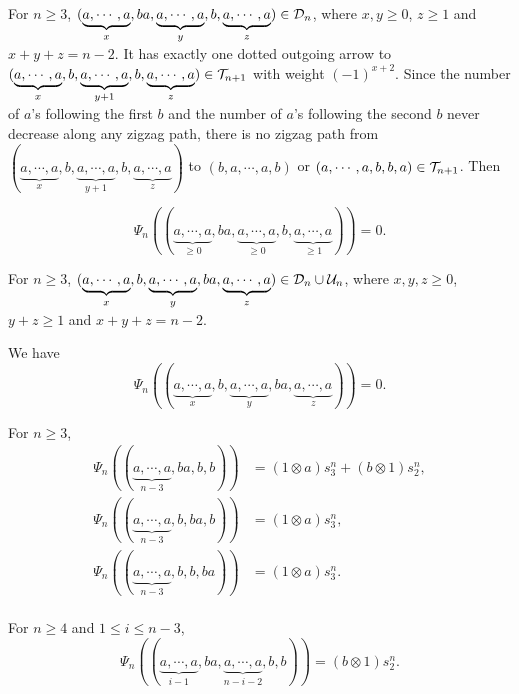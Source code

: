 \documentclass[10pt, reqno]{amsart}
\theoremstyle{definition}
\theoremstyle{remark}
\numberwithin{equation}{section}
\begin{document}
For \(n\ge 3\),  \((\underbrace{a,\cdots,a}_{x},ba,\underbrace{a,\cdots,a}_{y},b,\underbrace{a,\cdots,a}_{z})\in \mathcal{D}_n\), where \(x, y\ge 0\), \(z\ge1\) and \(x+y+z=n-2\). 
It has exactly one dotted outgoing arrow to \((\underbrace{a,\cdots,a}_{x},b,\underbrace{a,\cdots,a}_{y+1},b,\underbrace{a,\cdots,a}_{z})\in \mathcal{T}_{n+1}\) with weight \((-1)^{x+2}\). Since the number of \(a\)'s following the first \(b\) and the number of \(a\)'s following the second \(b\) never decrease along any zigzag path, there is no zigzag path from $(\underbrace{a,\cdots,a}_{x},b,\underbrace{a,\cdots,a}_{y+1},b,\underbrace{a,\cdots,a}_{z})$ to  \((b,a,\cdots,a,b)\) or \((a,\cdots,a,b,b,a)\in \mathcal{T}_{n+1}\). Then

\begin{equation}\label{equ: ba,b}
    \Psi_n((\underbrace{a,\cdots,a}_{\ge 0},ba,\underbrace{a,\cdots,a}_{\ge 0},b,\underbrace{a,\cdots,a}_{\ge 1}))=0.
\end{equation}


For \(n\ge 3\), $(\underbrace{a,\cdots,a}_{x},b,\underbrace{a,\cdots,a}_{y},ba,\underbrace{a,\cdots,a}_{z})\in \mathcal{D}_n \cup \mathcal{U}_n$, where 
 $x,y,z\ge0$, $y+z\ge1$ and $x+y+z=n-2$.

 We have
\begin{equation}\label{equ: b,ba}
\Psi_n((\underbrace{a,\cdots,a}_x,b,\underbrace{a,\cdots,a}_y,ba,\underbrace{a,\cdots,a}_z))=0.
\end{equation}


For \(n\ge3\),
$$\begin{aligned}
    \Psi_n((\underbrace{a,\cdots,a}_{n-3}, ba, b,b)) &=(1\otimes a)s_3^n+ (b\otimes 1)s_2^n,\\
    \Psi_n((\underbrace{a,\cdots,a}_{n-3}, b, ba, b)) &=(1\otimes a)s_3^n,\\
    \Psi_n((\underbrace{a,\cdots,a}_{n-3}, b, b,ba)) &=(1\otimes a)s_3^n.\\
\end{aligned}$$


For \(n\ge4\) and \(1\le i \le n-3\),
$$\Psi_n((\underbrace{a,\cdots,a}_{i-1}, ba, \underbrace{a,\cdots,a}_{n-i-2}, b,b))= (b\otimes 1)s_2^n.$$
\end{document}
